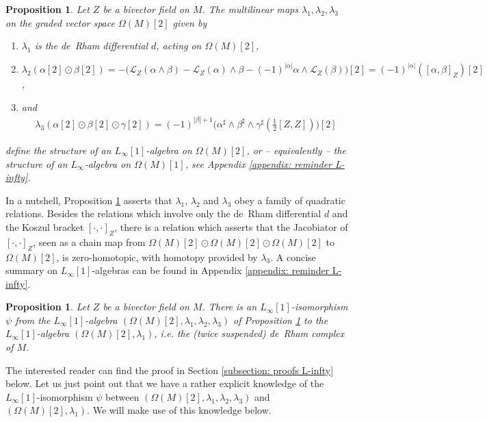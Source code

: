 \documentclass[11pt,thmsa]{amsart}
\newtheorem{proposition}[theorem]{Proposition}
\theoremstyle{definition}
\newcommand{\Lie}{\mathcal{L}}
\begin{document}
{\begin{proposition}\label{proposition: extended Koszul}
Let $Z$ be a bivector field on $M$. The multilinear maps $\lambda_1,\lambda_2,\lambda_3$ on the graded vector space $\Omega(M)[2]$ given by
\begin{enumerate}
\item $\lambda_1$ is the de~Rham differential $d$, acting on $\Omega(M)[2]$,
\item $\lambda_2(\alpha[2] \odot \beta[2])=-\Big(\Lie_Z(\alpha\wedge \beta) - \Lie_Z(\alpha)\wedge \beta - (-1)^{\vert \alpha \vert}\alpha \wedge \Lie_Z(\beta)\Big)[2] = (-1)^{|\alpha|} ([\alpha,\beta]_Z)[2]$,
\item and
\begin{eqnarray*}
\lambda_3(\alpha[2]\odot \beta[2]\odot \gamma[2])=(-1)^{|\beta|+1}\Big(\alpha^\sharp\wedge \beta^\sharp \wedge \gamma^\sharp(\frac{1}{2}[Z,Z])\Big)[2]
\end{eqnarray*}
\end{enumerate}
define the structure of an $L_\infty[1]$-algebra
on $\Omega(M)[2]$, or -- equivalently -- the structure of an $L_\infty$-algebra on $\Omega(M)[1]$, see Appendix \ref{appendix: reminder L-infty}.
\end{proposition}



In a nutshell, Proposition \ref{proposition: extended Koszul}
asserts that $\lambda_1$, $\lambda_2$ and $\lambda_3$ obey a family of quadratic relations.
Besides the relations which involve only the de~Rham differential $d$ and the Koszul bracket $[\cdot,\cdot]_Z$, there is a relation which asserts that the Jacobiator of $[\cdot,\cdot]_Z$, seen as a chain map from $\Omega(M)[2]\odot \Omega(M)[2]\odot \Omega(M)[2]$ to $\Omega(M)[2]$, is zero-homotopic, with homotopy provided by $\lambda_3$.
A concise summary on $L_\infty[1]$-algebras can be found in Appendix \ref{appendix: reminder L-infty}.




\begin{proposition}\label{proposition: extended Koszul 2}
Let $Z$ be a bivector field on $M$.
There is an $L_\infty[1]$-{\em isomorphism} $\psi$ from the
$L_\infty[1]$-algebra $(\Omega(M)[2],\lambda_1,\lambda_2,\lambda_3)$
of Proposition \ref{proposition: extended Koszul}
to the $L_\infty[1]$-algebra $(\Omega(M)[2],\lambda_1)$, i.e.
the (twice suspended) de~Rham complex of $M$.
\end{proposition}

The interested reader can find the proof in Section \ref{subsection: proofs L-infty} below. 
Let us just point out that we have a rather explicit knowledge of the $L_{\infty}[1]$-isomorphism $\psi$
between $(\Omega(M)[2],\lambda_1,\lambda_2,\lambda_3)$
and $(\Omega(M)[2],\lambda_1)$.
We will make use of this knowledge below.

}
\end{document}
